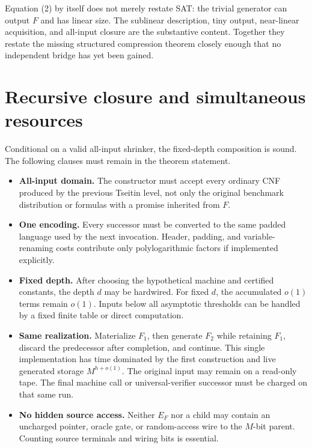 \documentclass[11pt]{article}
\begin{document}
Equation (2) by itself does not merely restate SAT: the trivial generator can
output $F$ and has linear size.  The sublinear description, tiny output,
near-linear acquisition, and all-input closure are the substantive content.
Together they restate the missing structured compression theorem closely
enough that no independent bridge has yet been gained.

\section{Recursive closure and simultaneous resources}

Conditional on a valid all-input shrinker, the fixed-depth composition is
sound.  The following clauses must remain in the theorem statement.

\begin{itemize}
\item[] \textbf{All-input domain.}
The constructor must accept every ordinary CNF produced by the previous
Tseitin level, not only the original benchmark distribution or formulas with
a promise inherited from $F$.

\item[] \textbf{One encoding.}
Every successor must be converted to the same padded language used by the
next invocation.  Header, padding, and variable-renaming costs contribute
only polylogarithmic factors if implemented explicitly.

\item[] \textbf{Fixed depth.}
After choosing the hypothetical machine and certified constants, the depth
$d$ may be hardwired.  For fixed $d$, the accumulated $o(1)$ terms remain
$o(1)$.  Inputs below all asymptotic thresholds can be handled by a fixed
finite table or direct computation.

\item[] \textbf{Same realization.}
Materialize $F_1$, then generate $F_2$ while retaining $F_1$, discard the
predecessor after completion, and continue.  This single implementation has
time dominated by the first construction and live generated storage
$M^{h+o(1)}$.  The original input may remain on a read-only tape.  The final
machine call or universal-verifier successor must be charged on that same
run.

\item[] \textbf{No hidden source access.}
Neither $E_F$ nor a child may contain an uncharged pointer, oracle gate, or
random-access wire to the $M$-bit parent.  Counting source terminals and
wiring bits is essential.
\end{itemize}
\end{document}
